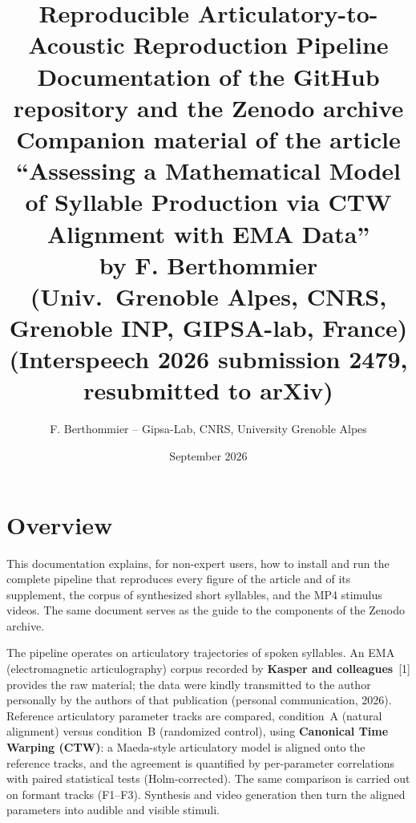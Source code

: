\documentclass[11pt,a4paper]{article}
\title{\textbf{Reproducible Articulatory-to-Acoustic Reproduction Pipeline}\\[4pt]
\large Documentation of the GitHub repository and the Zenodo archive\\[2pt]
\normalsize Companion material of the article ``Assessing a Mathematical Model
of Syllable Production via CTW Alignment with EMA Data''\\
by F. Berthommier (Univ.\ Grenoble Alpes, CNRS, Grenoble INP, GIPSA-lab, France)\\
(Interspeech 2026 submission 2479, resubmitted to arXiv)}
\author{F. Berthommier -- Gipsa-Lab, CNRS, University Grenoble Alpes}
\date{September 2026}
\begin{document}
\maketitle

\begin{center}
\end{center}

\section{Overview}
This documentation explains, for non-expert users, how to install and run the
complete pipeline that reproduces every figure of the article and of its
supplement, the corpus of synthesized short syllables, and the MP4 stimulus
videos. The same document serves as the guide to the components of the Zenodo
archive.

The pipeline operates on articulatory trajectories of spoken syllables. An
EMA (electromagnetic articulography) corpus recorded by \textbf{Kasper and
colleagues}~[1] provides the raw material; the data were kindly
transmitted to the author personally by the authors of that publication
(personal communication, 2026). Reference articulatory parameter tracks
are compared, condition~A (natural alignment) versus condition~B (randomized
control), using \textbf{Canonical Time Warping (CTW)}: a Maeda-style
articulatory model is aligned onto the reference tracks, and the agreement is
quantified by per-parameter correlations with paired statistical tests
(Holm-corrected). The same comparison is carried out on formant tracks
(F1--F3). Synthesis and video generation then turn the aligned parameters into
audible and visible stimuli.
\end{document}
